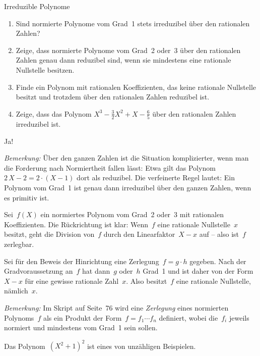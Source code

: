 \documentclass{algblatt}
\begin{document}
\begin{aufgabe}{Irreduzible Polynome}
\begin{enumerate}
\item Sind normierte Polynome vom Grad~1 stets irreduzibel über den rationalen
Zahlen?
\item Zeige, dass normierte Polynome vom Grad~2 oder~3 über den rationalen
Zahlen genau dann reduzibel sind, wenn sie mindestens eine rationale Nullstelle
besitzen.
\item Finde ein Polynom mit rationalen Koeffizienten, das keine rationale
Nullstelle besitzt und trotzdem über den rationalen Zahlen reduzibel ist.
\item Zeige, dass das Polynom $X^3 - \frac{3}{2}X^2 + X - \frac{6}{5}$ über den
rationalen Zahlen irreduzibel ist.
\end{enumerate}

\begin{loesungE}
\item Ja!

\emph{Bemerkung:} Über den ganzen Zahlen ist die Situation komplizierter, wenn
man die Forderung nach Normiertheit fallen lässt: Etwa
gilt das Polynom~$2\,X - 2 = 2 \cdot (X - 1)$ dort als reduzibel. Die
verfeinerte Regel lautet: Ein Polynom vom Grad~1 ist genau dann irreduzibel
über den ganzen Zahlen, wenn es primitiv ist.

\item Sei~$f(X)$ ein normiertes Polynom vom Grad~2 oder~3 mit rationalen
Koeffizienten. Die Rückrichtung ist klar: Wenn~$f$ eine rationale
Nullstelle~$x$ besitzt, geht die Division von~$f$ durch den Linearfaktor~$X-x$
auf -- also ist~$f$ zerlegbar.

Sei für den Beweis der Hinrichtung eine Zerlegung~$f = g \cdot h$ gegeben. Nach
der Gradvoraussetzung an~$f$ hat dann~$g$ oder~$h$ Grad~1 und ist daher von der
Form~$X-x$ für eine gewisse rationale Zahl~$x$. Also besitzt~$f$ eine rationale
Nullstelle, nämlich~$x$.

\emph{Bemerkung:} Im Skript auf Seite~76 wird eine \emph{Zerlegung} eines
normierten Polynoms~$f$ als ein Produkt der Form~$f = f_1 \cdots f_n$
definiert, wobei die~$f_i$ jeweils normiert und mindestens vom Grad~1 sein
sollen.

\item Das Polynom~$(X^2+1)^2$ ist eines von unzähligen Beispielen.


\end{loesungE}
\end{aufgabe}
\end{document}
